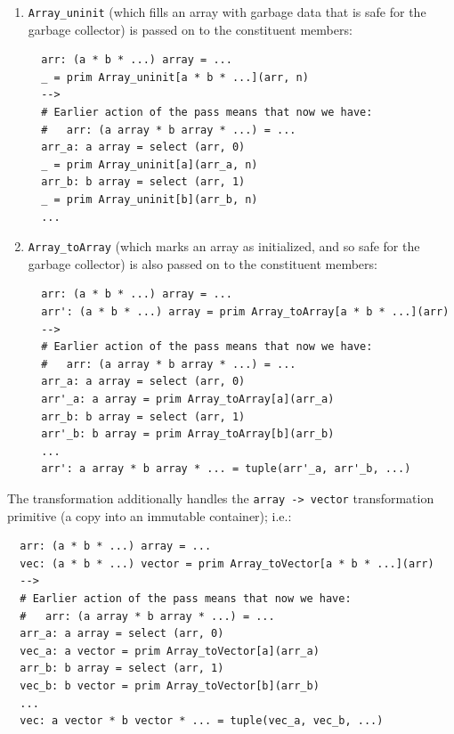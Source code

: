 \documentclass[leqno,11pt]{article}
\begin{document}
\begin{enumerate}
\item \texttt{Array\_uninit} (which fills an array with garbage data that is
  safe for the garbage collector) is passed on to the constituent members:

\begin{verbatim}
  arr: (a * b * ...) array = ...
  _ = prim Array_uninit[a * b * ...](arr, n)
  -->
  # Earlier action of the pass means that now we have:
  #   arr: (a array * b array * ...) = ...
  arr_a: a array = select (arr, 0)
  _ = prim Array_uninit[a](arr_a, n)
  arr_b: b array = select (arr, 1)
  _ = prim Array_uninit[b](arr_b, n)
  ...
\end{verbatim}

\item \texttt{Array\_toArray} (which marks an array as initialized, and so safe
  for the garbage collector) is also passed on to the constituent members:

\begin{verbatim}
  arr: (a * b * ...) array = ...
  arr': (a * b * ...) array = prim Array_toArray[a * b * ...](arr)
  -->
  # Earlier action of the pass means that now we have:
  #   arr: (a array * b array * ...) = ...
  arr_a: a array = select (arr, 0)
  arr'_a: a array = prim Array_toArray[a](arr_a)
  arr_b: b array = select (arr, 1)
  arr'_b: b array = prim Array_toArray[b](arr_b)
  ...
  arr': a array * b array * ... = tuple(arr'_a, arr'_b, ...)
\end{verbatim}

\end{enumerate}

The transformation additionally handles the \texttt{array -> vector}
transformation primitive (a copy into an immutable container); i.e.:

\begin{verbatim}
  arr: (a * b * ...) array = ...
  vec: (a * b * ...) vector = prim Array_toVector[a * b * ...](arr)
  -->
  # Earlier action of the pass means that now we have:
  #   arr: (a array * b array * ...) = ...
  arr_a: a array = select (arr, 0)
  vec_a: a vector = prim Array_toVector[a](arr_a)
  arr_b: b array = select (arr, 1)
  vec_b: b vector = prim Array_toVector[b](arr_b)
  ...
  vec: a vector * b vector * ... = tuple(vec_a, vec_b, ...)
\end{verbatim}
\end{document}
